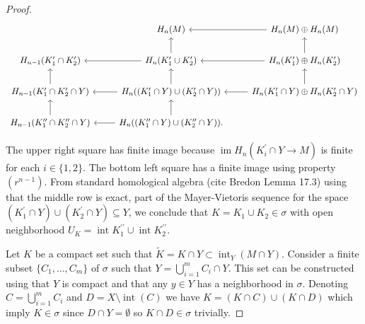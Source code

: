 \documentclass{amsart}
\theoremstyle{definition}
\newcommand{\dprime}{{\prime\prime}}
\DeclareMathOperator{\im}{im}
\DeclareMathOperator{\interior}{int}
\begin{document}
\begin{proof}
		\begin{equation*}
		\begin{tikzcd}
		& H_n(M) & \arrow[l] H_n(M) \oplus H_n(M) \\
		H_{n-1}(K_1^\prime \cap K_2^\prime) & 
		H_{n}(K_1^\prime \cup K_2^\prime) \arrow[l] \arrow[u] &
		H_{n}(K_1^\prime) \oplus H_n(K_2^\prime) \arrow[l] \arrow[u] \\
		H_{n-1}(K_1^\prime \cap K_2^\prime \cap Y) \arrow[u] & 
		H_{n}((K_1^\prime \cap Y) \cup (K_2^\prime \cap Y)) \arrow[l] \arrow[u] &
		H_{n}(K_1^\prime \cap Y) \oplus H_n(K_2^\prime \cap Y) \arrow[l] \arrow[u] \\
		H_{n-1}(K_1^\dprime \cap K_2^\dprime \cap Y) \arrow[u] & 
		H_{n}((K_1^\dprime \cap Y) \cup (K_2^\dprime \cap Y)) \arrow[l] \arrow[u]. &
		\end{tikzcd}
		\end{equation*}
		
		
		The upper right square has finite image because $\im H_n\left(K^\prime_i \cap Y \to M\right)$ is finite for each $i \in \{1, 2\}$. The bottom left square has a finite image using property $(r^{n-1})$. From standard homological algebra (cite Bredon 	Lemma 17.3) using that the middle row is exact, part of the Mayer-Vietoris sequence for the space $(K_1^\prime \cap Y) \cup (K_2^\prime \cap Y) \subseteq Y$, we conclude that $K = K_1 \cup K_2 \in \sigma$ with open neighborhood $U_K = \interior K^\dprime_1 \cup \interior K^\dprime_2$.
		
		Let $K$ be a compact set such that $\widetilde K = K \cap Y \subset \interior_Y(M \cap Y)$.
		Consider a finite subset $\{C_1, \dots, C_m\}$ of $\sigma$ such that $Y = \bigcup_{i=1}^m C_i \cap Y$. This set can be constructed using that $Y$ is compact and that any $y \in Y$ has a neighborhood in $\sigma$. Denoting $C = \bigcup_{i=1}^m C_i$ and $D = X \setminus \interior(C)$ we have $K = (K \cap C) \cup (K \cap D)$ which imply $K \in \sigma$ since $D \cap Y = \emptyset$ so $K \cap D \in \sigma$ trivially.
	\end{proof}
	
\end{document}
